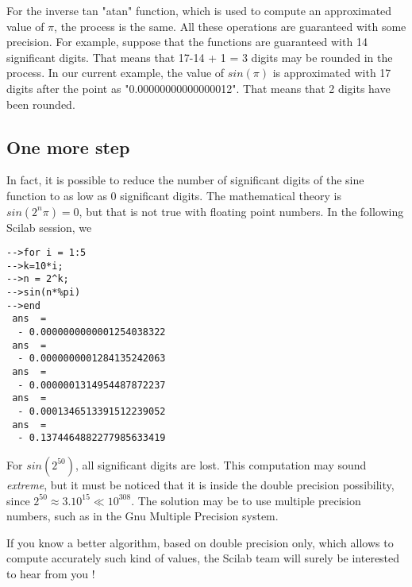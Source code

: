 For the inverse tan "atan" function, which is 
used to compute an approximated value of $\pi$, the process is the same.
All these operations are guaranteed with some precision.
For example, suppose that the functions are guaranteed with 14 significant
digits. That means that 17-14 + 1 = 3 digits may be rounded in the process.
In our current example, the value of $sin(\pi)$ is approximated 
with 17 digits after the point as "0.00000000000000012". That means that
2 digits have been rounded. 

\subsection{One more step}

In fact, it is possible to reduce the number of 
significant digits of the sine function to as low as 0 significant digits.
The mathematical theory is $sin(2^n \pi) = 0$, but that is not true with
floating point numbers. In the following Scilab session, we 

\begin{verbatim}
-->for i = 1:5
-->k=10*i;
-->n = 2^k;
-->sin(n*%pi)
-->end
 ans  =
  - 0.0000000000001254038322  
 ans  =
  - 0.0000000001284135242063  
 ans  =
  - 0.0000001314954487872237  
 ans  =
  - 0.0001346513391512239052  
 ans  =
  - 0.1374464882277985633419  
\end{verbatim}

For $sin(2^{50})$, all significant digits are lost. This computation
may sound \emph{extreme}, but it must be noticed that it is inside the 
double precision possibility, since $2^{50} \approx 3.10^{15} \ll 10^{308}$.
The solution may be to use multiple precision numbers, such as in the 
Gnu Multiple Precision system.

If you know a better algorithm, based on double precision only, 
which allows to compute accurately such kind of values, the Scilab 
team will surely be interested to hear from you !

